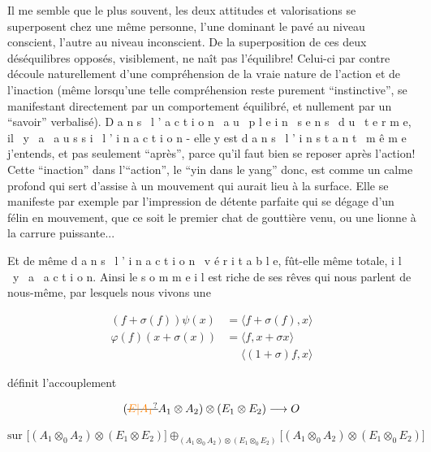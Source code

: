 Il me semble que le plus souvent, les deux attitudes et valorisations se superposent chez une même personne, l'une dominant le pavé au niveau conscient, l'autre au niveau inconscient. De la superposition de ces deux déséquilibres opposés, visiblement, ne naît pas l'équilibre! Celui-ci par contre découle naturellement d'une compréhension de la vraie nature de l'action et de l'inaction (même lorsqu'une telle compréhension reste purement ``instinctive'', se manifestant directement par un comportement équilibré, et nullement par un ``savoir'' verbalisé). D a n s \ l ' a c t i o n \ a u \ p l e i n \ s e n s \ d u \ t e r m e, il \ y \ a \ a u s s i \ l ' i n a c t i o n - elle y est d a n s \ l ' i n s t a n t \ m ê m e j'entends, et pas seulement ``après'', parce qu'il faut bien se reposer après l'action! Cette ``inaction'' dans l'``action'', le ``yin dans le yang'' donc, est comme un calme profond qui sert d'assise à un mouvement qui aurait lieu à la surface. Elle se manifeste par exemple par l'impression de détente parfaite qui se dégage d'un félin en mouvement, que ce soit le premier chat de gouttière venu, ou une lionne à la carrure puissante...

Et de même d a n s \ l ' i n a c t i o n \ v é r i t a b l e, fût-elle même totale, i l \ y \ a \ a c t i o n. Ainsi le s o m m e i l est riche de ses rêves qui nous parlent de nous-même, par lesquels nous vivons une


\[
\begin{aligned}
 (f+\sigma(f))\psi(x)&=\langle f+\sigma(f),x\rangle\\
 \varphi(f)(x+\sigma(x))&=\langle f,x+\sigma x\rangle\\
 &\phantom{=}\langle(1+\sigma)f,x\rangle
\end{aligned}
\]

  définit l'accouplement

\[ (\deleted{\unsure{E|A_1}}A_1\otimes A_2)\otimes(E_1\otimes E_2)\longrightarrow O \]

\[
\text{sur }\big[(A_1\otimes_0 A_2)\otimes(E_1\otimes E_2)\big]
 \oplus_{(A_1\otimes_0 A_2)\otimes(E_1\otimes_0 E_2)}
 \big[(A_1\otimes_{0} A_2)\otimes(E_1\otimes_0 E_2)\big]
\]

